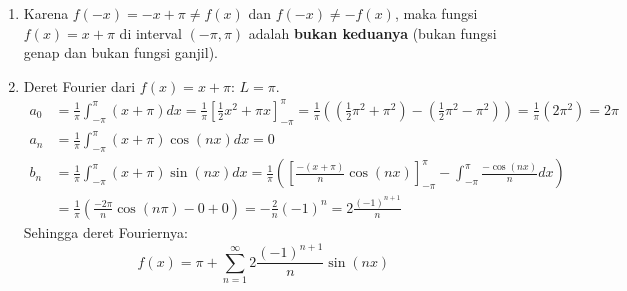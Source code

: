 \documentclass[11pt,letterpaper]{article}
\begin{document}
\begin{enumerate}
\begin{enumerate}[label=\alph*)]
\begin{center}
                \end{center}
          \item Karena $f(-x) = -x + \pi \neq f(x)$ dan $f(-x) \neq -f(x)$, maka fungsi $f(x) = x + \pi$ di interval $(-\pi, \pi)$ adalah \textbf{bukan keduanya} (bukan fungsi genap dan bukan fungsi ganjil).
          \item Deret Fourier dari $f(x) = x + \pi$:
                $L = \pi$.
                \begin{align*}
                  a_0 & = \frac{1}{\pi} \int_{-\pi}^{\pi} (x + \pi) dx = \frac{1}{\pi} \left[ \frac{1}{2}x^2 + \pi x \right]_{-\pi}^{\pi} = \frac{1}{\pi} \left( (\frac{1}{2}\pi^2 + \pi^2) - (\frac{1}{2}\pi^2 - \pi^2) \right) = \frac{1}{\pi} (2\pi^2) = 2\pi \\
                  a_n & = \frac{1}{\pi} \int_{-\pi}^{\pi} (x + \pi) \cos(nx) dx = 0                                                                                                                                                                              \\
                  b_n & = \frac{1}{\pi} \int_{-\pi}^{\pi} (x + \pi) \sin(nx) dx = \frac{1}{\pi} \left( \left[ \frac{-(x+\pi)}{n}\cos(nx) \right]_{-\pi}^{\pi} - \int_{-\pi}^{\pi} \frac{-\cos(nx)}{n} dx \right)                                                 \\
                      & = \frac{1}{\pi} \left( \frac{-2\pi}{n}\cos(n\pi) - 0 + 0 \right) = -\frac{2}{n}(-1)^n = 2\frac{(-1)^{n+1}}{n}
                \end{align*}
                Sehingga deret Fouriernya:
                \[ f(x) = \pi + \sum_{n=1}^{\infty} 2\frac{(-1)^{n+1}}{n} \sin(nx) \]
        \end{enumerate}


\end{enumerate}
\end{document}
